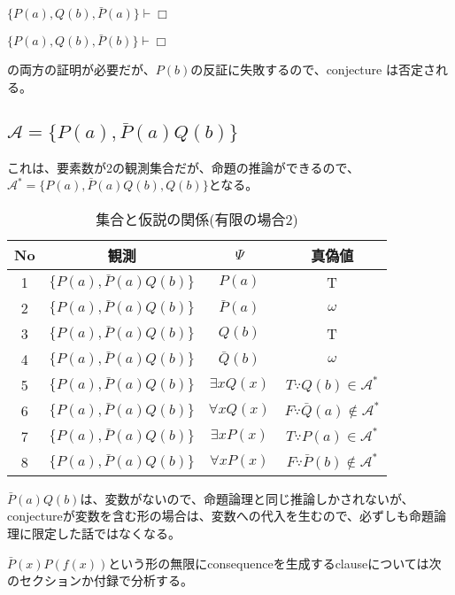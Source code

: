 \documentclass[10pt, oneside]{jarticle}   	%
\theoremstyle{definition}
\newcommand{\undet}{\omega}
\newcommand{\cont}{\Box}
\newcommand{\eset}[1]{\{{#1}\}}
\newcommand{\clos}[1]{\mathcal{#1}^{*}}
\begin{document}
$\{P(a), Q(b), \bar P(a)\} \vdash \cont$

$\{P(a), Q(b), \bar P(b)\} \vdash \cont$

の両方の証明が必要だが、$P(b)$の反証に失敗するので、conjecture は否定される。


\subsection{$\mathcal{A}=\eset{P(a), \bar P(a)Q(b)}$}

これは、要素数が2の観測集合だが、命題の推論ができるので、$\clos{A}=\eset{P(a), \bar P(a)Q(b), Q(b)}$となる。

\begin{table}[htbp]
 \centering
 \begin{tabular}{|c|c|c|c|}\hline
   No & 観測 & $\Psi$ & 真偽値 \\ \hline
   1 & $\{P(a), \bar{P}(a)Q(b)\}$ & $P(a)$ & T \\ \hline
   2 & $\{P(a), \bar P(a)Q(b)\}$ & $\bar P(a)$ & $\undet$ \\ \hline %
   3 & $\{P(a), \bar P(a)Q(b)\}$ & $Q(b)$ & T \\ \hline
   4 & $\{P(a), \bar P(a)Q(b)\}$ & $\bar Q(b)$ & $\undet$ \\ \hline  %
   5 & $\{P(a), \bar P(a)Q(b)\}$ & $\exists x Q(x)$ & $T \because Q(b) \in \clos{A}$ \\ \hline
   6 & $\{P(a), \bar P(a)Q(b)\}$ & $\forall x Q(x)$ & $F \because  \bar Q(a) \notin \clos{A}$ \\ \hline
   7 & $\{P(a), \bar P(a)Q(b)\}$ & $\exists x P(x)$ & $T \because P(a) \in \clos{A}$ \\ \hline
   8 & $\{P(a), \bar P(a)Q(b)\}$ & $\forall x P(x)$ & $F \because \bar P(b) \notin \clos{A}$ \\ \hline
 \end{tabular}
 \caption{集合と仮説の関係(有限の場合2)}
 \label{tab:ex0104}
\end{table}


$\bar P(a) Q(b)$は、変数がないので、命題論理と同じ推論しかされないが、conjectureが変数を含む形の場合は、変数への代入を生むので、必ずしも命題論理に限定した話ではなくなる。

$\bar P(x) P(f(x))$という形の無限にconsequenceを生成するclauseについては次のセクションか付録で分析する。
\end{document}
